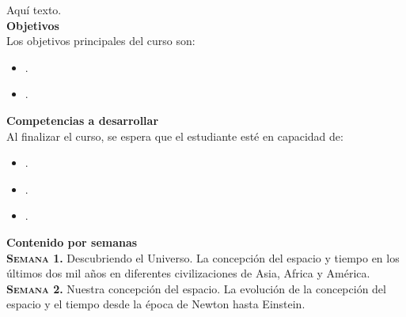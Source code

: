 \documentclass[letterpaper,10pt,onecolumn]{article}
\begin{document}
\noindent\normalsize Aqu\'i texto.\\[0.1cm]

\noindent\textbf{\large {} \quad Objetivos}\\[-0.2cm]


\noindent\normalsize Los objetivos principales del curso son:

\begin{itemize}
	\item .\\[-0.6cm]
	\item .\\[-0.2cm]
\end{itemize}

\noindent\textbf{\large {} \quad Competencias a desarrollar}\\[-0.2cm]


\noindent\normalsize Al finalizar el curso, se espera que el estudiante est\'e en capacidad de:

\begin{itemize}
	\item .\\[-0.6cm]
	\item .\\[-0.6cm]
	\item .\\[-0.2cm]
\end{itemize}

\noindent\textbf{\large {} \quad Contenido por semanas}\\[-0.2cm]


\noindent\normalsize \textbf{\textsc{Semana 1.}} Descubriendo el Universo. 
La concepci\'on del espacio y tiempo en los \'ultimos dos mil a\~nos en diferentes civilizaciones de Asia, Africa y Am\'erica.\\[-0.3cm] 


\noindent\textbf{\textsc{Semana 2.}} Nuestra concepci\'on del espacio. 
La evoluci\'on de la concepci\'on del espacio y el tiempo desde la \'epoca de Newton hasta Einstein.\\[-0.3cm]
\end{document}
